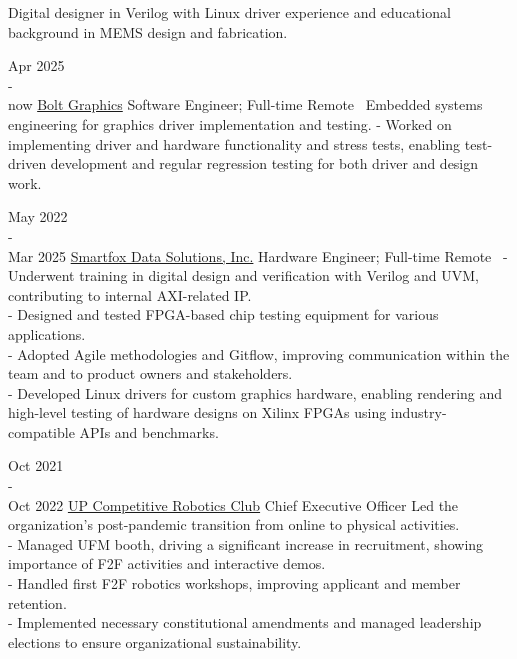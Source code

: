 \documentclass[9pt]{developercv}
\begin{document}
\begin{minipage}[t]{0.475\textwidth} 
	\vspace{-\baselineskip}

	Digital designer in Verilog with Linux driver experience and educational background in MEMS design and fabrication. \\


	\begin{entrylist} 
		\entry
			{Apr 2025 \\ - \\ now}
			{\href{https://bolt.graphics}{Bolt Graphics}}
			{Software Engineer; Full-time Remote}
			{\
				Embedded systems engineering for graphics driver implementation and testing.
				- Worked on implementing driver and hardware functionality and stress tests, enabling test-driven development and regular regression testing for both driver and design work.
			}	

		\entry
			{May 2022 \\ - \\ Mar 2025}
			{\href{https://smartfoxdata.com}{Smartfox Data Solutions, Inc.}}
			{Hardware Engineer; Full-time Remote}
			{\
				- Underwent training in digital design and verification with Verilog and UVM, contributing to internal AXI-related IP. \\
				- Designed and tested FPGA-based chip testing equipment for various applications. \\
				- Adopted Agile methodologies and Gitflow, improving communication within the team and to product owners and stakeholders. \\
				- Developed Linux drivers for custom graphics hardware, enabling rendering and high-level testing of hardware designs on Xilinx FPGAs using industry-compatible APIs and benchmarks.
			}	
	\end{entrylist}
	\cvsect{Organizations}
	\begin{entrylist}
		\entry
			{Oct 2021 \\ - \\ Oct 2022}
			{\href{https://upcrc.org}{UP Competitive Robotics Club}}
			{Chief Executive Officer}
			{Led the organization's post-pandemic transition from online to physical activities.\\
			- Managed UFM booth, driving a significant increase in recruitment, showing importance of F2F activities and interactive demos.\\
			- Handled first F2F robotics workshops, improving applicant and member retention.\\
			- Implemented necessary constitutional amendments and managed leadership elections to ensure organizational sustainability.}
	\end{entrylist}



\end{minipage}
\end{document}
